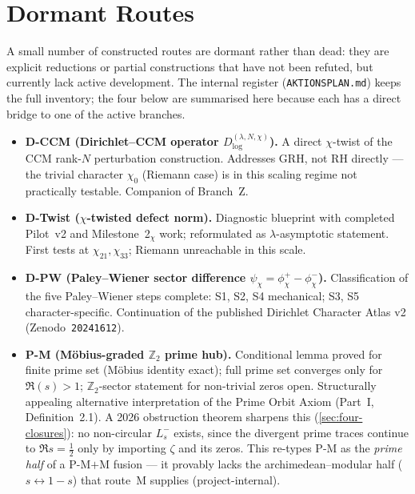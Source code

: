 \documentclass[12pt,a4paper]{article}
\theoremstyle{definition}
\theoremstyle{remark}
\begin{document}
\section{Dormant Routes}
\label{sec:dormant}

A small number of constructed routes are dormant rather than dead: they
are explicit reductions or partial constructions that have not been
refuted, but currently lack active development. The internal register
(\texttt{AKTIONSPLAN.md}) keeps the full inventory; the four below are
summarised here because each has a direct bridge to one of the active
branches.

\begin{itemize}
  \item \textbf{D-CCM (Dirichlet--CCM operator
    $D^{(\lambda,N,\chi)}_{\log}$).} A direct $\chi$-twist of the
    CCM rank-$N$ perturbation construction. Addresses GRH, not RH
    directly --- the trivial character $\chi_0$ (Riemann case) is in
    this scaling regime not practically testable. Companion of
    Branch~Z.

  \item \textbf{D-Twist ($\chi$-twisted defect norm).} Diagnostic
    blueprint with completed Pilot~v2 and Milestone~2$_\chi$ work;
    reformulated as $\lambda$-asymptotic statement. First tests at
    $\chi_{21}, \chi_{33}$; Riemann unreachable in this scale.

  \item \textbf{D-PW (Paley--Wiener sector difference
    $\psi_\chi = \phi_\chi^+ - \phi_\chi^-$).} Classification of the
    five Paley--Wiener steps complete: S1, S2, S4 mechanical; S3, S5
    character-specific. Continuation of the published Dirichlet Character
    Atlas v2 (Zenodo~\texttt{20241612}).

  \item \textbf{P-M (M\"obius-graded $\mathbb{Z}_2$ prime hub).}
    Conditional lemma proved for finite prime set (M\"obius identity
    exact); full prime set converges only for $\Re(s)>1$;
    $\mathbb{Z}_2$-sector statement for non-trivial zeros open.
    Structurally appealing alternative interpretation of the Prime Orbit
    Axiom (Part~I, Definition~2.1). A 2026 obstruction theorem sharpens
    this (\cref{sec:four-closures}): no non-circular $L_s^-$ exists, since
    the divergent prime traces continue to $\Re s=\tfrac12$ only by
    importing $\zeta$ and its zeros. This re-types P-M as the \emph{prime
    half} of a P-M$+$M fusion --- it provably lacks the archimedean--modular
    half ($s\leftrightarrow 1-s$) that route~M supplies (project-internal).
\end{itemize}
\end{document}
